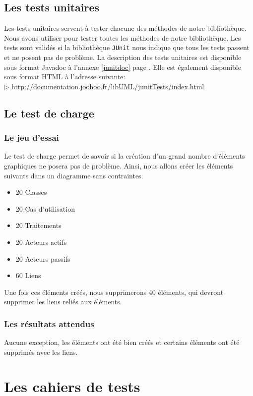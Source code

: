 \documentclass[12pt,a4paper,openany]{report}
\begin{document}
	\section{Les tests unitaires}
	Les tests unitaires servent à tester chacune des méthodes de notre bibliothèque.\\
	Nous avons utiliser 
	pour tester toutes les méthodes de notre bibliothèque. Les tests sont validés si 
	la bibliothèque \texttt{JUnit} nous indique que tous les tests passent et ne posent pas de problème.
	La description des tests unitaires est disponible sous format Javadoc à l'annexe \ref{junitdoc} page \pageref{junitdoc}.
	Elle est également disponible sous format HTML à l'adresse suivante: \\
	$\rhd$ \url{http://documentation.joohoo.fr/libUML/junitTests/index.html}\\
		
	\section{Le test de charge}
		\subsection{Le jeu d'essai}
		Le test de charge permet de savoir si la création d'un grand nombre d'éléments graphiques ne posera pas de problème. 
		Ainsi, nous allons créer les éléments suivants dans un diagramme sans contraintes.
		\begin{itemize}
			\item 20 Classes
			\item 20 Cas d'utilisation
			\item 20 Traitements
			\item 20 Acteurs actifs
			\item 20 Acteurs passifs
			\item 60 Liens
		\end{itemize}
		Une fois ces éléments créés, nous supprimerons 40 éléments, qui devront supprimer les liens reliés aux éléments.
		\subsection{Les résultats attendus}
		Aucune exception, les éléments ont été bien créés et certains éléments ont été supprimés avec les liens.
	\chapter{Les cahiers de tests}	
\end{document}
